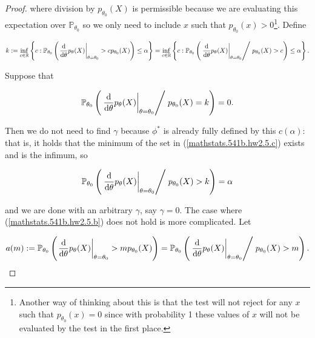 \begin{proof}
where division by \(p_{\theta_0}(X) \) is permissible because we are evaluating this expectation over \(\mathbb{P}_{\theta_0}\) so we only need to include \(x\) such that \(p_{\theta_0}(x) > 0\)\footnote{Another way of thinking about this is that the test will not reject for any \(x\) such that \(p_{\theta_0}(x) = 0\) since with probability 1 these values of \(x\) will not be evaluated by the test in the first place.}. Define

\begin{equation}\label{mathstats.541b.hw2.5.c}
k := \inf_{c \in \mathbb{R}} \left\{ c:  \mathbb{P}_{\theta_0} \left( \left.  \deriv{}{\theta} p_\theta(X) \right|_{\theta = \theta_0} > c p_{\theta_0}(X) \right) \leq \alpha  \right\}  
= \inf_{c \in \mathbb{R}} \left\{  c: \mathbb{P}_{\theta_0} \left(  \left. \left.  \deriv{}{\theta} p_\theta(X) \right|_{\theta = \theta_0}  \middle/ \right.  p_{\theta_0}(X) > c \right) \leq \alpha \right\}.
\end{equation}

Suppose that 

\begin{equation}\label{mathstats.541b.hw2.5.b}
\mathbb{P}_{\theta_0} \left(  \left. \left.  \deriv{}{\theta} p_\theta(X) \right|_{\theta = \theta_0}  \middle/ \right.  p_{\theta_0}(X) = k \right) = 0 .
\end{equation}

Then we do not need to find \(\gamma\) because \(\phi^*\) is already fully defined by this \(c(\alpha)\): that is, it holds that the minimum of the set in (\ref{mathstats.541b.hw2.5.c}) exists and is the infimum, so

\[
\mathbb{P}_{\theta_0} \left(  \left. \left.  \deriv{}{\theta} p_\theta(X) \right|_{\theta = \theta_0}  \middle/ \right.  p_{\theta_0}(X) > k \right) = \alpha
\]

and we are done with an arbitrary \(\gamma\), say \(\gamma = 0\). The case where (\ref{mathstats.541b.hw2.5.b}) does not hold is more complicated. Let 


\[
a(m)  : =
\mathbb{P}_{\theta_0} \left( \left.  \deriv{}{\theta} p_\theta(X) \right|_{\theta = \theta_0} > m p_{\theta_0}(X) \right)
 =\mathbb{P}_{\theta_0} \left(  \left. \left.  \deriv{}{\theta} p_\theta(X) \right|_{\theta = \theta_0}  \middle/ \right.  p_{\theta_0}(X) > m \right) .
\]


\end{proof}
